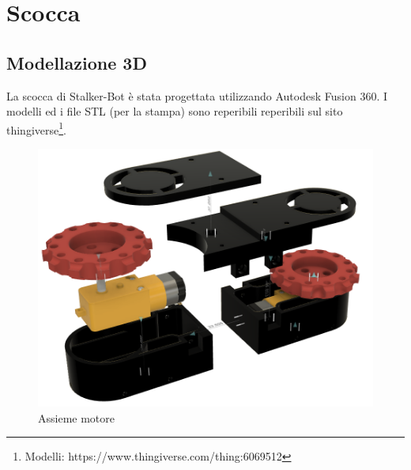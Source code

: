 \documentclass[12pt]{report}
\begin{document}
\section{Scocca}

\subsection{Modellazione 3D}

La scocca di Stalker-Bot è stata progettata utilizzando Autodesk Fusion 360. I modelli ed i file STL (per la stampa) sono reperibili reperibili sul sito thingiverse\footnote{Modelli: https://www.thingiverse.com/thing:6069512}.

\FloatBarrier
\begin{figure}[!ht]
    \centering
    \includegraphics[width=13cm]{images/motori_no_spigoli.png}
    \caption{Assieme motore}
\end{figure}
\FloatBarrier
\end{document}
